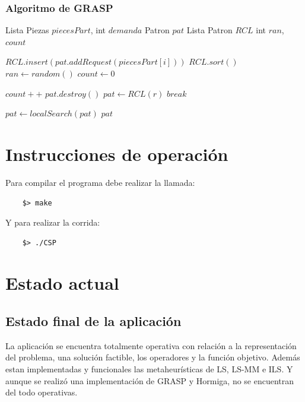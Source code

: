 \documentclass[letterpaper,11pt]{article}
\begin{document}
\subsubsection{Algoritmo de GRASP}

\begin{center}
\begin{algorithmic}

\REQUIRE Lista Piezas $piecesPart$, int $demanda$
\STATE  Patron $pat$
\STATE  Lista Patron $RCL$
\STATE  int $ran$, $count$
  
    	\STATE $RCL.insert(pat.addRequest(piecesPart[i]))$
    \ENDWHILE
    \STATE $RCL.sort()$
    \STATE $ran \gets random()$
    \STATE $count \gets 0$

    	\STATE $count++$
        	\STATE $pat.destroy()$
        	\STATE $pat \gets RCL(r)$
        	\STATE $break$
      	\ENDIF
    \ENDWHILE
   
    \STATE $pat \gets localSearch(pat)$
\ENDWHILE
\RETURN $pat$

\end{algorithmic}
\end{center}

\section{Instrucciones de operaci\'on}

Para compilar el programa debe realizar la llamada:
\begin{verbatim}
    $> make
\end{verbatim}
Y para realizar la corrida:
\begin{verbatim}
    $> ./CSP
\end{verbatim}

\section{Estado actual}

\subsection{Estado final de la aplicaci\'on}

La aplicaci\'on se encuentra totalmente operativa con relaci\'on a la representaci\'on del problema, una soluci\'on
factible, los operadores y la funci\'on objetivo. Adem\'as estan implementadas y funcionales las metaheur\'isticas de LS, LS-MM e ILS. Y aunque se realiz\'o una implementaci\'on de GRASP y Hormiga, no se encuentran del todo operativas.
\end{document}
